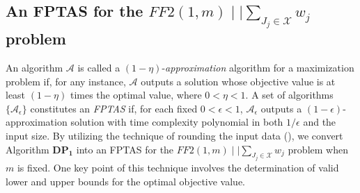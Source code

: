 \documentclass[12pt, eqno, limlimits]{article}
\begin{document}
\begin{sloppypar}
\begin{center}
        \end{center}
        
        
        \subsection{An FPTAS for the $FF2(1, m) \mid \mid  \sum_{J_j \in \mathcal{X}} w_j$ problem}
        
        An algorithm ${\mathcal A}$ is called a $(1-\eta)$-\textit{approximation} algorithm for a maximization problem if, for any instance, ${\mathcal A}$ outputs a solution whose objective value is at least  $(1-\eta)$ times the optimal value, where $0 <\eta < 1$.  A set of algorithms $\{{\mathcal A}_{\epsilon}\}$ constitutes an \textit{FPTAS} if, for each fixed $0 < \epsilon <1$, ${\mathcal A}_{\epsilon}$ outputs a $(1-\epsilon)$-approximation solution with time complexity polynomial in both $1/{\epsilon}$ and the input size.
        By utilizing the technique of rounding the input data (\citealp{Sahni1976JACM}), we convert Algorithm $\mathbf{DP_1}$ into an FPTAS for the $FF2(1, m) \mid \mid \sum_{J_j \in \mathcal{X}} w_j$ problem when $m$ is fixed. One key point of this technique involves the determination of valid lower and upper bounds for the optimal objective value.
        

\end{sloppypar}
\end{document}
